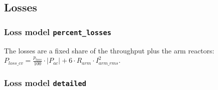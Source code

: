 \subsection{Losses}
\label{sec:converter-losses}

\subsubsection{Loss model \texttt{percent\_losses}}

The losses are a fixed share of the throughput plus the arm reactors:
$P_{loss\_cv} = \tfrac{p_{loss}}{100} \cdot |P_{ac}| + 6 \cdot R_{arm} \cdot I_{arm\_rms}^2$.

\subsubsection{Loss model \texttt{detailed}}

